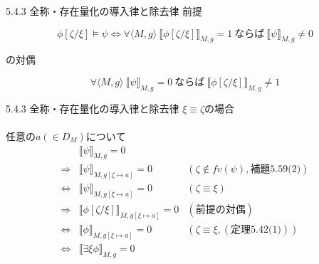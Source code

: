 \documentclass[dvipdfmx,11pt]{beamer}
\begin{document}
\begin{frame}{5.4.3 全称・存在量化の導入律と除去律}
  前提

  \[
  \phi[\zeta/\xi]\vDash\psi \iff \forall \langle M,g \rangle \ \llbracket\phi[\zeta/\xi]\rrbracket_{M,g} = 1 \ \textit{ならば}\ \llbracket\psi\rrbracket_{M,g} \neq 0
  \]

  の対偶

  \[
  \forall \langle M,g \rangle \ \llbracket\psi\rrbracket_{M,g} = 0 \ \textit{ならば}\ \llbracket\phi[\zeta/\xi]\rrbracket_{M,g}\neq 1
  \]
\end{frame}

\begin{frame}{5.4.3 全称・存在量化の導入律と除去律}
  \(\xi\equiv\zeta\)の場合\\\mbox{}\\

  任意の\(a(\in D_M)\)について
  \[
  \begin{array}{rll}
    & \llbracket\psi\rrbracket_{M,g}=0 & \\
    \Longrightarrow & \llbracket\psi\rrbracket_{M,g[\zeta\mapsto a]}=0 & (\zeta\not\in\textit{fv}(\psi),\textit{補題5.59(2)}) \\
    \iff & \llbracket\psi\rrbracket_{M,g[\xi\mapsto a]}=0 & (\zeta\equiv\xi) \\
    \Longrightarrow & \llbracket\phi[\zeta/\xi]\rrbracket_{M,g[\xi\mapsto a]}=0 & (\textit{前提の対偶}) \\
    \iff & \llbracket\phi\rrbracket_{M,g[\xi\mapsto a]}=0 & (\zeta\equiv\xi,(\textit{定理5.42(1)})) \\
    \iff & \llbracket\exists\xi\phi\rrbracket_{M,g}=0 &
  \end{array}
  \]

\end{frame}
\end{document}
